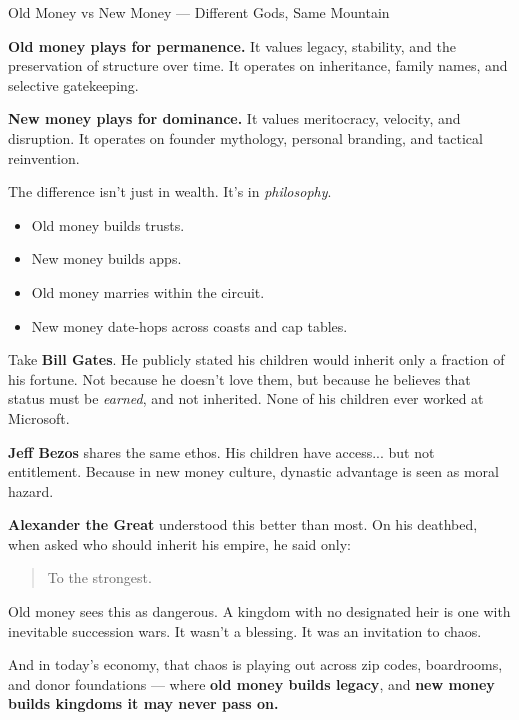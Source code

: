 \begin{HistoricalSidebar}{Old Money vs New Money --- Different Gods, Same Mountain}

    \textbf{Old money plays for permanence.}  
    It values legacy, stability, and the preservation of structure over time.  
    It operates on inheritance, family names, and selective gatekeeping.

    \medskip
    
    \textbf{New money plays for dominance.}  
    It values meritocracy, velocity, and disruption.  
    It operates on founder mythology, personal branding, and tactical reinvention.

    \medskip
    
    The difference isn’t just in wealth.  
    It’s in \textit{philosophy}.

    \medskip
    
    \begin{itemize}
      \item Old money builds trusts.  
      \item New money builds apps.  
      \item Old money marries within the circuit.  
      \item New money date-hops across coasts and cap tables.  
    \end{itemize}

    \medskip
    
    Take \textbf{Bill Gates}.  
    He publicly stated his children would inherit only a fraction of his fortune.  
    Not because he doesn’t love them, but because he believes that status must be \textit{earned}, and not inherited.  
    None of his children ever worked at Microsoft.

    \medskip
    
    \textbf{Jeff Bezos} shares the same ethos.  
    His children have access... but not entitlement.  
    Because in new money culture, dynastic advantage is seen as moral hazard.
    
    \medskip
    
    \textbf{Alexander the Great} understood this better than most.  
    On his deathbed, when asked who should inherit his empire, he said only:
    
    \begin{quote}
        To the strongest.
    \end{quote}

    Old money sees this as dangerous.  
    A kingdom with no designated heir is one with inevitable succession wars.
    It wasn’t a blessing.  
    It was an invitation to chaos.
    
    \medskip
    
    And in today’s economy, that chaos is playing out across zip codes, boardrooms, and donor foundations — where  
    \textbf{old money builds legacy},  and \textbf{new money builds kingdoms it may never pass on.}

\end{HistoricalSidebar}



